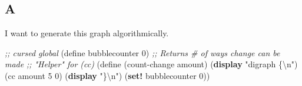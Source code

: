 \documentclass[
]{article}
\newenvironment{Shaded}{}{}
\newcommand{\CharTok}[1]{\textcolor[rgb]{0.25,0.44,0.63}{#1}}
\newcommand{\CommentTok}[1]{\textcolor[rgb]{0.38,0.63,0.69}{\textit{#1}}}
\newcommand{\DecValTok}[1]{\textcolor[rgb]{0.25,0.63,0.44}{#1}}
\newcommand{\ExtensionTok}[1]{#1}
\newcommand{\FunctionTok}[1]{\textcolor[rgb]{0.02,0.16,0.49}{#1}}
\newcommand{\KeywordTok}[1]{\textcolor[rgb]{0.00,0.44,0.13}{\textbf{#1}}}
\newcommand{\NormalTok}[1]{#1}
\newcommand{\StringTok}[1]{\textcolor[rgb]{0.25,0.44,0.63}{#1}}
\begin{document}
\hypertarget{a-12}{%
\subsection{A}\label{a-12}}

I want to generate this graph algorithmically.

\hypertarget{count-change-graphviz}{%
\label{count-change-graphviz}}%
\begin{Shaded}
\begin{Highlighting}[numbers=left,,]
\CommentTok{;; cursed global}
\NormalTok{(}\ExtensionTok{define}\FunctionTok{ bubblecounter }\DecValTok{0}\NormalTok{)}
\CommentTok{;; Returns \# of ways change can be made}
\CommentTok{;; "Helper" for (cc)}
\NormalTok{(}\ExtensionTok{define}\FunctionTok{ }\NormalTok{(count{-}change amount)}
\NormalTok{  (}\KeywordTok{display} \StringTok{"digraph \{}\CharTok{\textbackslash{}n}\StringTok{"}\NormalTok{)}
\NormalTok{  (cc amount }\DecValTok{5} \DecValTok{0}\NormalTok{)}
\NormalTok{  (}\KeywordTok{display} \StringTok{"\}}\CharTok{\textbackslash{}n}\StringTok{"}\NormalTok{)}
\NormalTok{  (}\KeywordTok{set!}\NormalTok{ bubblecounter }\DecValTok{0}\NormalTok{))}


\end{Highlighting}
\end{Shaded}
\end{document}

